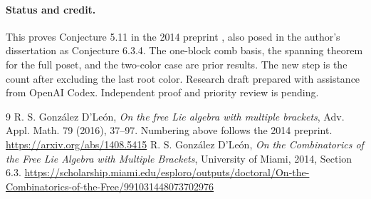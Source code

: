 \documentclass[11pt]{article}
\begin{document}
\paragraph{Status and credit.} This proves Conjecture 5.11 in the 2014
preprint \cite{g}, also posed in the author's dissertation as Conjecture 6.3.4.
The one-block comb basis, the spanning theorem for the full poset, and the
two-color case are prior results. The new step is the count after excluding
the last root color. Research draft prepared with assistance from OpenAI
Codex. Independent proof and priority review is pending.
\begin{thebibliography}{9}
 R. S. Gonz\'alez D'Le\'on, \emph{On the free Lie algebra with
multiple brackets}, Adv. Appl. Math. 79 (2016), 37--97. Numbering above
follows the 2014 preprint. \url{https://arxiv.org/abs/1408.5415}
 R. S. Gonz\'alez D'Le\'on, \emph{On the Combinatorics of the
Free Lie Algebra with Multiple Brackets}, University of Miami, 2014,
Section 6.3. \url{https://scholarship.miami.edu/esploro/outputs/doctoral/On-the-Combinatorics-of-the-Free/991031448073702976}
\end{thebibliography}
\end{document}
